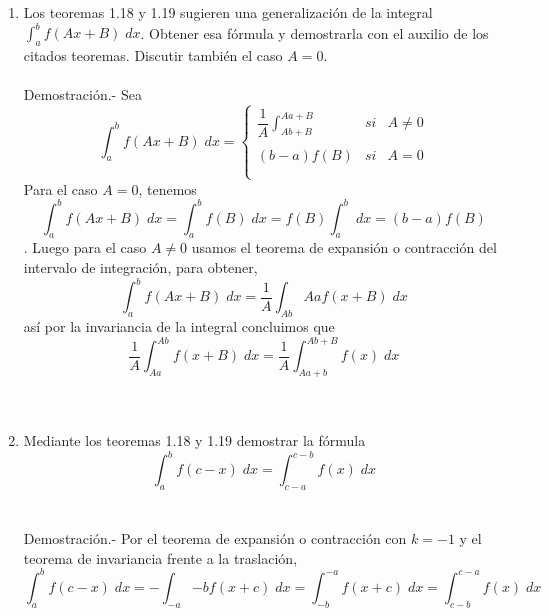 \begin{enumerate}[\bfseries 1.]
    \item Los teoremas 1.18 y 1.19 sugieren una generalización de la integral $\int_a^b f(Ax+B) \; dx$. Obtener esa fórmula y demostrarla con el auxilio de los citados teoremas. Discutir también el caso $A=0$.\\\\
	Demostración.-\; Sea 
	$$\int_a^b f(Ax+B)\;dx = \left\{ \begin{array}{rcl} 
	    \dfrac{1}{A}\displaystyle\int_{Ab+B}^{Aa+B}&si&A\neq 0\\\\
	    (b-a)f(B)&si&A = 0\\\\
	\end{array}\right.$$
	Para el caso $A=0$, tenemos $$\int_a^b f(Ax+B)\; dx = \int_{a}^b f(B)\; dx = f(B)\int_a^b \; dx = (b-a)f(B)$$.
	Luego para el caso $A\neq 0$ usamos el teorema de expansión o contracción del intervalo de integración, para obtener, 
	$$\int_a^b f(Ax+B)\; dx = \dfrac{1}{A}\int_{Ab}{Aa} f(x+B)\; dx$$
	así por la invariancia de la integral concluimos que 
	$$\dfrac{1}{A}\int_{Aa}^{Ab} f(x+B)\; dx = \dfrac{1}{A}\int_{Aa+b}^{Ab+B} f(x)\; dx$$\\\\

    \item Mediante los teoremas 1.18 y 1.19 demostrar la fórmula 
	$$\int_a^b f(c-x)\; dx = \int_{c-a}^{c-b}f(x) \; dx$$\\\\
	Demostración.-\; Por el teorema de expansión o contracción con $k=-1$ y el teorema de invariancia frente a la traslación, 
	$$\int_a^b f(c-x)\; dx = - \int_{-a}{-b} f(x+c)\; dx = \int_{-b}^{-a} f(x+c)\; dx = \int_{c-b}^{c-a} f(x) \; dx$$\\\\

\end{enumerate}
